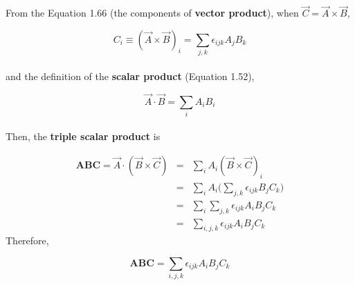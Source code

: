 \documentclass[a4paper]{article}
\begin{document}
\Large

From the Equation 1.66 (the components of \textbf{vector product}), when $\vec{C} = \vec{A} \times \vec{B}$,

\begin{equation}
	C_i \equiv (\vec{A}\times\vec{B})_i = \sum_{j,k} \epsilon_{ijk}A_jB_k \tag{1.66}
\end{equation}
\\
and the definition of the \textbf{scalar product} (Equation 1.52),

\begin{equation}
  \vec{A}\cdot\vec{B} = \sum_i A_i B_i \tag{1.52}
\end{equation}
\\

Then, the \textbf{triple scalar product} is

\begin{eqnarray*}
	\mathbf{ABC} = \vec{A}\cdot(\vec{B}\times\vec{C}) & = & \sum_i A_i (\vec{B}\times\vec{C})_i \\
	& = & \sum_i A_i \Big(\sum_{j,k} \epsilon_{ijk}B_jC_k \Big) \\
	& = & \sum_i \sum_{j,k} \epsilon_{ijk}A_iB_jC_k \\
	& = & \sum_{i,j,k} \epsilon_{ijk}A_iB_jC_k
\end{eqnarray*}
Therefore,

\begin{equation*}
	\mathbf{ABC} = \sum_{i,j,k} \epsilon_{ijk}A_iB_jC_k
\end{equation*}
\end{document}
